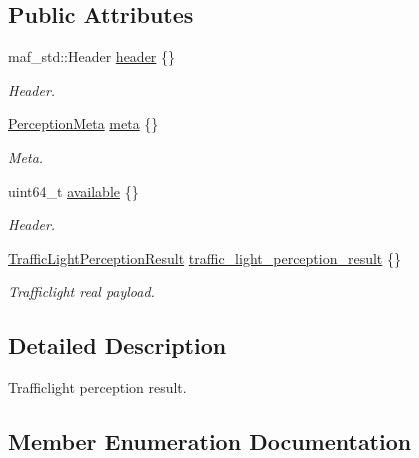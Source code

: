 \subsection*{Public Attributes}
\begin{DoxyCompactItemize}
\item 
maf\+\_\+std\+::\+Header \hyperlink{structmaf__perception__interface_1_1TrafficLightPerception_a2c0d177f6f66928833411b7e13de1ec6}{header} \{\}
\begin{DoxyCompactList}\small\item\em Header. \end{DoxyCompactList}\item 
\hyperlink{structmaf__perception__interface_1_1PerceptionMeta}{Perception\+Meta} \hyperlink{structmaf__perception__interface_1_1TrafficLightPerception_aed6f28ee7f350a6da057c096a0e57edb}{meta} \{\}
\begin{DoxyCompactList}\small\item\em Meta. \end{DoxyCompactList}\item 
uint64\+\_\+t \hyperlink{structmaf__perception__interface_1_1TrafficLightPerception_a80d38a09abcdb524b69cf47582f06c41}{available} \{\}
\begin{DoxyCompactList}\small\item\em Header. \end{DoxyCompactList}\item 
\hyperlink{structmaf__perception__interface_1_1TrafficLightPerceptionResult}{Traffic\+Light\+Perception\+Result} \hyperlink{structmaf__perception__interface_1_1TrafficLightPerception_a033aef47e735404a1a68ecfb925dee54}{traffic\+\_\+light\+\_\+perception\+\_\+result} \{\}
\begin{DoxyCompactList}\small\item\em Trafficlight real payload. \end{DoxyCompactList}\end{DoxyCompactItemize}


\subsection{Detailed Description}
Trafficlight perception result. 

\subsection{Member Enumeration Documentation}
\mbox{\label{structmaf__perception__interface_1_1TrafficLightPerception_a77b8efdac5d604c1500085e74762050c}} 
